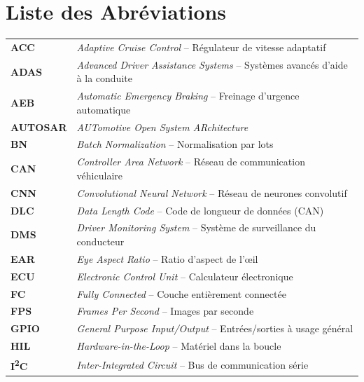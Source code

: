 
\chapter*{Liste des Abréviations}

\vspace{0.5cm}

\begin{longtable}{@{} >{\bfseries}l @{\hspace{2cm}} l @{}}
ACC     & \textit{Adaptive Cruise Control} -- Régulateur de vitesse adaptatif \\[0.2cm]
ADAS    & \textit{Advanced Driver Assistance Systems} -- Systèmes avancés d'aide à la conduite \\[0.2cm]
AEB     & \textit{Automatic Emergency Braking} -- Freinage d'urgence automatique \\[0.2cm]
AUTOSAR & \textit{AUTomotive Open System ARchitecture} \\[0.2cm]
BN      & \textit{Batch Normalization} -- Normalisation par lots \\[0.2cm]
CAN     & \textit{Controller Area Network} -- Réseau de communication véhiculaire \\[0.2cm]
CNN     & \textit{Convolutional Neural Network} -- Réseau de neurones convolutif \\[0.2cm]
DLC     & \textit{Data Length Code} -- Code de longueur de données (CAN) \\[0.2cm]
DMS     & \textit{Driver Monitoring System} -- Système de surveillance du conducteur \\[0.2cm]
EAR     & \textit{Eye Aspect Ratio} -- Ratio d'aspect de l'œil \\[0.2cm]
ECU     & \textit{Electronic Control Unit} -- Calculateur électronique \\[0.2cm]
FC      & \textit{Fully Connected} -- Couche entièrement connectée \\[0.2cm]
FPS     & \textit{Frames Per Second} -- Images par seconde \\[0.2cm]
GPIO    & \textit{General Purpose Input/Output} -- Entrées/sorties à usage général \\[0.2cm]
HIL     & \textit{Hardware-in-the-Loop} -- Matériel dans la boucle \\[0.2cm]
I\textsuperscript{2}C & \textit{Inter-Integrated Circuit} -- Bus de communication série \\[0.2cm]

\end{longtable}
